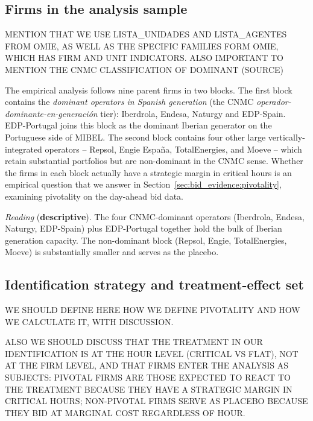 \documentclass[11pt,a4paper]{article}
\begin{document}
\subsection{Firms in the analysis sample}\label{sec:data:firms}

MENTION THAT WE USE LISTA\_UNIDADES AND LISTA\_AGENTES FROM OMIE, AS WELL AS THE SPECIFIC FAMILIES FORM OMIE, WHICH HAS FIRM AND UNIT INDICATORS.
ALSO IMPORTANT TO MENTION THE CNMC CLASSIFICATION OF DOMINANT (SOURCE)

The empirical analysis follows nine parent firms in two blocks. The first block contains the \textit{dominant operators in Spanish generation} (the CNMC \textit{operador-dominante-en-generaci\'on} tier): Iberdrola, Endesa, Naturgy and EDP-Spain. EDP-Portugal joins this block as the dominant Iberian generator on the Portuguese side of MIBEL. The second block contains four other large vertically-integrated operators -- Repsol, Engie Espa\~na, TotalEnergies, and Moeve -- which retain substantial portfolios but are non-dominant in the CNMC sense. Whether the firms in each block actually have a strategic margin in critical hours is an empirical question that we answer in Section~\ref{sec:bid_evidence:pivotality}, examining pivotality on the day-ahead bid data.

\begin{table}[H]
\centering
\caption{\textbf{Firms in the analysis sample.} Capacity: max DA-offered power across 2025, share-weighted. Market share: PDBF programmed sell, 2025. Channel breakdown in Appendix~\ref{app:firms}.}
\label{tab:firms_main}

\end{table}

\textit{Reading} (\textbf{descriptive}). The four CNMC-dominant operators (Iberdrola, Endesa, Naturgy, EDP-Spain) plus EDP-Portugal together hold the bulk of Iberian generation capacity. The non-dominant block (Repsol, Engie, TotalEnergies, Moeve) is substantially smaller and serves as the placebo.

\subsection{Identification strategy and treatment-effect set}\label{sec:data:identification}

WE SHOULD DEFINE HERE HOW WE DEFINE PIVOTALITY AND HOW WE CALCULATE IT, WITH DISCUSSION.

ALSO WE SHOULD DISCUSS THAT THE TREATMENT IN OUR IDENTIFICATION IS AT THE HOUR LEVEL (CRITICAL VS FLAT), NOT AT THE FIRM LEVEL, AND THAT FIRMS ENTER THE ANALYSIS AS SUBJECTS: PIVOTAL FIRMS ARE THOSE EXPECTED TO REACT TO THE TREATMENT BECAUSE THEY HAVE A STRATEGIC MARGIN IN CRITICAL HOURS; NON-PIVOTAL FIRMS SERVE AS PLACEBO BECAUSE THEY BID AT MARGINAL COST REGARDLESS OF HOUR.
\end{document}
